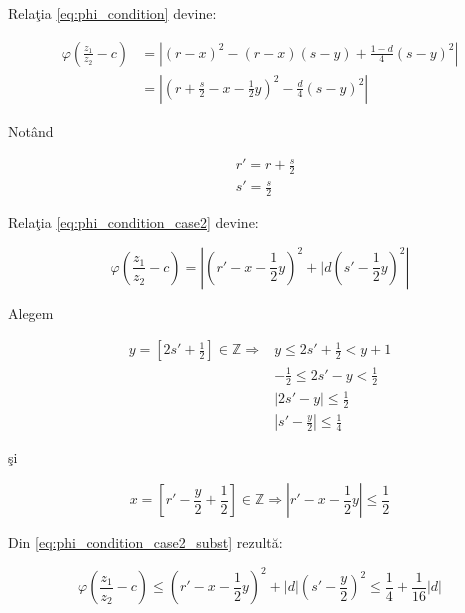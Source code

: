 \documentclass[12pt]{article}
\begin{document}
Relaţia \eqref{eq:phi_condition} devine:

\begin{equation} \label{eq:phi_condition_case2}
\begin{split}
    \varphi \left(\frac{z_1}{z_2} - c\right)  &= \left| (r-x)^2 - (r-x)(s-y) + \frac{1-d}{4}(s-y)^2 \right| \\
    &= \left| \left(r + \frac{s}{2} - x - \frac{1}{2}y\right)^2 - \frac{d}{4}(s-y)^2 \right|
\end{split}
\end{equation}

Notând

\begin{equation}
\begin{split}
    & r' = r + \frac{s}{2} \\
    & s' = \frac{s}{2}
\end{split}
\end{equation}

Relaţia \eqref{eq:phi_condition_case2} devine:

\begin{equation} \label{eq:phi_condition_case2_subst}
    \varphi \left(\frac{z_1}{z_2} - c\right) =
    \left| \left(r' - x - \frac{1}{2}y \right) ^2  + |d \left(s' - \frac{1}{2}y\right)^2  \right|
\end{equation}

Alegem

\begin{equation}
\begin{split}
    y = \left[ 2s' + \frac{1}{2} \right] \in \mathbb{Z} \Rightarrow & 
    y \leq 2s' + \frac{1}{2} < y + 1 \\
    & -\frac{1}{2} \leq 2s'- y < \frac{1}{2} \\ 
    & \left| 2s' - y \right| \leq \frac{1}{2} \\
    & \boxed{\left| s' - \frac{y}{2} \right| \leq \frac{1}{4}}
\end{split}
\end{equation}

şi

\begin{equation}
    x = \left[ r' - \frac{y}{2} + \frac{1}{2} \right] \in \mathbb{Z} \Rightarrow 
    \boxed{|r' - x - \frac{1}{2}y| \leq \frac{1}{2}}
\end{equation}


Din \eqref{eq:phi_condition_case2_subst} rezultă:

\begin{equation}
    \varphi \left(\frac{z_1}{z_2} - c\right) \leq
    \left( r'- x - \frac{1}{2}y \right)^2 + |d|\left(s' - \frac{y}{2}\right)^2 \leq \frac{1}{4} + \frac{1}{16}|d|
\end{equation}
\end{document}
